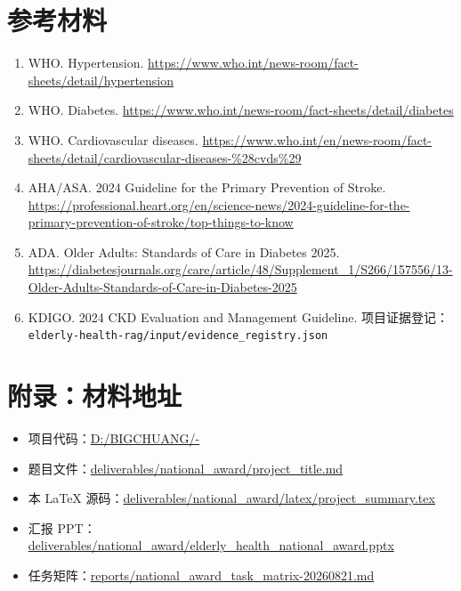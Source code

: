 \documentclass[UTF8,a4paper,zihao=-4]{ctexart}
\begin{document}
\section{参考材料}
\begin{enumerate}
\item WHO. Hypertension. \url{https://www.who.int/news-room/fact-sheets/detail/hypertension}
\item WHO. Diabetes. \url{https://www.who.int/news-room/fact-sheets/detail/diabetes}
\item WHO. Cardiovascular diseases. \url{https://www.who.int/en/news-room/fact-sheets/detail/cardiovascular-diseases-%28cvds%29}
\item AHA/ASA. 2024 Guideline for the Primary Prevention of Stroke. \url{https://professional.heart.org/en/science-news/2024-guideline-for-the-primary-prevention-of-stroke/top-things-to-know}
\item ADA. Older Adults: Standards of Care in Diabetes 2025. \url{https://diabetesjournals.org/care/article/48/Supplement_1/S266/157556/13-Older-Adults-Standards-of-Care-in-Diabetes-2025}
\item KDIGO. 2024 CKD Evaluation and Management Guideline. 项目证据登记：\texttt{elderly-health-rag/input/evidence\_registry.json}
\end{enumerate}

\section*{附录：材料地址}
\begin{itemize}
\item 项目代码：\url{D:/BIGCHUANG/-}
\item 题目文件：\url{deliverables/national_award/project_title.md}
\item 本 LaTeX 源码：\url{deliverables/national_award/latex/project_summary.tex}
\item 汇报 PPT：\url{deliverables/national_award/elderly_health_national_award.pptx}
\item 任务矩阵：\url{reports/national_award_task_matrix-20260821.md}
\end{itemize}
\end{document}
